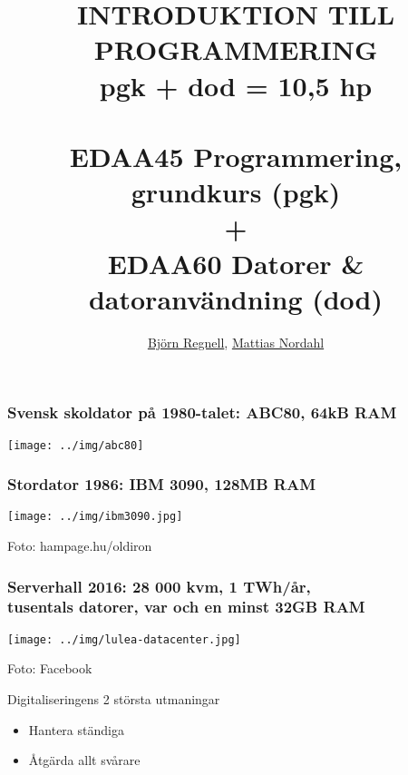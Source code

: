 \documentclass{lecturesimple}
\title[Kort presentation av pgk \& dod, \DateOfShow]{
INTRODUKTION TILL PROGRAMMERING\\ pgk + dod = 10,5 hp \\ ~ \\  
\textbf{EDAA45} Programmering, grundkurs (pgk) \\ + \\ \textbf{EDAA60} Datorer \& datoranvändning (dod)}
\author{\href{http://cs.lth.se/bjorn-regnell}{Björn Regnell}, \href{https://cs.lth.se/nordahl-mattias/}{Mattias Nordahl}}
\institute{\href{http://cs.lth.se}{Datavetenskap}, LTH}
\date{\DateOfShow}
\begin{document}
\frame{\titlepage}

\begin{frame}\frametitle{Svensk skoldator på 1980-talet: ABC80, 64kB RAM}
  \begin{center}
      \texttt{[image: ../img/abc80]}
  \end{center}
  \end{frame}
  
  
  \begin{frame}\frametitle{Stordator 1986: IBM 3090, %
      128MB RAM}
  \begin{center}
      \texttt{[image: ../img/ibm3090.jpg]}
    
      {\fontsize{5}{5}\selectfont\color{gray}
      Foto: hampage.hu/oldiron
    }
  \end{center}
  \end{frame}
    
  \begin{frame}\frametitle{Serverhall 2016: 28 000 kvm, 1 TWh/år, \\tusentals datorer, var och en minst 32GB RAM}
    \begin{center}
      \texttt{[image: ../img/lulea-datacenter.jpg]}
    
      {\fontsize{5}{5}\selectfont\color{gray}
    Foto: Facebook
    }
    \end{center}
  \end{frame}
  


\begin{Slide}{Digitaliseringens 2 största utmaningar}
  \begin{itemize}\Large
    \item Hantera ständiga 
    \item Åtgärda allt svårare  
  \end{itemize}  
\end{Slide}

\end{document}

